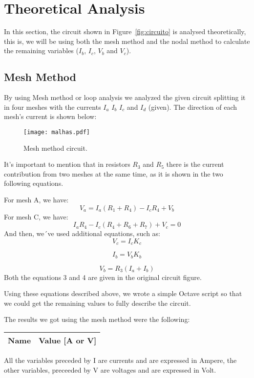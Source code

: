 \section{Theoretical Analysis}
\label{sec:analysis}

In this section, the circuit shown in Figure~\ref{fig:circuito} is analysed
theoretically, this is, we will be using both the mesh method and the nodal method to calculate the remaining variables ($I_b$, $I_c$, $V_b$ and $V_c$).

\subsection{Mesh Method}

By using Mesh method or loop analysis we analyzed the given circuit splitting it in four meshes with the currents $I_a$ $I_b$ $I_c$ and $I_d$ (given). The direction of each mesh’s current is shown below:

\begin{figure}[H] \centering
\texttt{[image: malhas.pdf]}
\caption{Mesh method circuit.}
\label{fig:malhas}
\end{figure}

It’s important to mention that in resistors $R_3$ and $R_5$ there is the current contribution from two meshes at the same time, as it is shown in the two following equations. \par
For mesh A, we have:
\begin{equation}
  V_a = I_a (R_1+R_4)-I_c R_4 + V_b
  \label{eq1}
\end{equation}
For mesh C, we have:
\begin{equation}
  I_a R_4 - I_c (R_4+R_6+R_7) + V_c = 0
  \label{eq2}
\end{equation}
And then, we´ve used additional equations, such as:
\begin{equation}
  V_c = I_c K_c
  \label{eq3}
\end{equation}

\begin{equation}
  I_b = V_b K_b
  \label{eq4}
\end{equation}

\begin{equation}
  V_b = R_3 (I_a+I_b)
  \label{eq5}
\end{equation}
Both the equations 3 and 4 are given in the original circuit figure. \par
Using these equations described above, we wrote a simple Octave script so that we could get the remaining values to fully describe the circuit. \par
The results we got using the mesh method were the following: 
\begin{center}
  \begin{tabular}{ | c | c | }
    \hline    
    {\bf Name} & {\bf Value [A or V]} \\ \hline
    
    \hline
  \end{tabular}
\end{center}
All the variables preceded by I are currents and are expressed in Ampere, the other variables, preceeded by V are voltages and are expressed in Volt.

